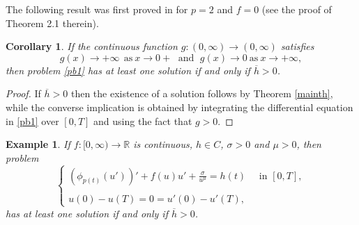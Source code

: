 \documentclass[11pt]{amsart}
\newtheorem{corollary}[theorem]{Corollary}
\newtheorem{example}[theorem]{Example}
\numberwithin{equation}{section} \textwidth=15.5cm
\begin{document}
The following result was first proved in \cite{[LaSo]} for $p=2$ and $f=0$ (see the proof of Theorem 2.1 therein).

\begin{corollary}\label{cormth}
If the continuous function $g:(0,\infty)\to (0,\infty)$ satisfies
\begin{equation*}
g(x)\to+\infty\ \ \mbox{as}\  x\to0+ \; \mbox{ and } \; g(x)\to0\  \mbox{as}\  x\to+\infty,
\end{equation*}
then problem \eqref{pb1} has at least one solution if and only if $\overline{h}>0$.
\end{corollary}
\begin{proof} If $\overline{h}>0$ then the existence of a solution follows by Theorem \ref{mainth}, while the converse implication is obtained by integrating the differential equation in \eqref{pb1} over $[0,T]$ and using the fact that $g>0$.
\end{proof}
\medskip

\begin{example}
{\em If $f:[0,\infty)\to\mathbb{R}$ is continuous, $h\in C$, $\sigma>0$ and $\mu>0$, then problem
\begin{equation*}
	\left \{
            \begin{array}{ll}
		      (\phi_{p(t)}(u'))'+f(u)u'+\displaystyle\frac{\sigma}{u^\mu}=h(t)\quad \mbox{ in }[0,T],\\
              \\
		      u(0)-u(T)=0=u'(0)-u'(T),
			\end{array}
\right.
\end{equation*}
has at least one solution if and only if $\overline{h}>0$.}
\end{example}
\end{document}
